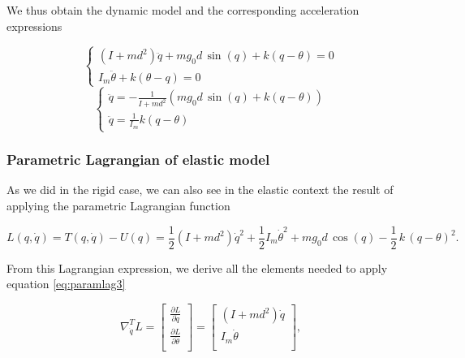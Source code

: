 \documentclass[a4paper]{article}
\begin{document}
We thus obtain the dynamic model and the corresponding acceleration expressions
\begin{center}
\begin{equation}
    \nonumber
    \begin{cases}
        (I+md^2)\ddot{q}+mg_0d\, \sin(q) +k(q-\theta)=0\\
        I_m\ddot{\theta}+k(\theta-q)=0
    \end{cases}
\end{equation}
\begin{equation}
    \label{eq:el_mod9}
    \begin{cases}
        \ddot{q}=-\frac{1}{I+md^2}(mg_0d\, \sin(q)+k(q-\theta))\\
        \ddot{q}=\frac{1}{I_m}k(q-\theta)
    \end{cases}
\end{equation}
\end{center}

\subsubsection{Parametric Lagrangian of elastic model}
As we did in the rigid case, we can also see in the elastic context the result of applying the parametric Lagrangian function

\begin{equation}
    \nonumber
    L(q,\dot{q}) = T(q,\dot{q}) - U(q) = \frac{1}{2}(I+md^2)\dot{q}^2 + \frac{1}{2} I_m \dot{\theta}^2 + mg_0d\, \cos(q) - \frac{1}{2}\,k\,(q-\theta)^{2}.
\end{equation}

From this Lagrangian expression, we derive all the elements needed to apply equation \eqref{eq:paramlag3}

\begin{equation}
    \nonumber
    \nabla_{\dot{q}}^{T} L = 
    \begin{bmatrix}
        \frac{\partial L}{\partial \dot{q}} \\[3mm]
        \frac{\partial L}{\partial \dot{\theta}} \\
    \end{bmatrix} =
    \begin{bmatrix}
        (I+md^2)\dot{q}\\[1mm]
        I_m\dot{\theta}\\
    \end{bmatrix},
\end{equation}
\end{document}
